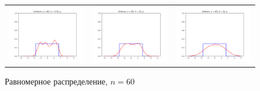 	\begin{figure}[H]
	\centering
	\begin{tabular}{ccc}
		\includegraphics[width=55mm, height =0.25\textheight]{pics/ker_u_60_1.png}
		&
		\includegraphics[width=55mm, height =0.25\textheight]{pics/ker_u_60_2.png}
		&
		\includegraphics[width=55mm, height =0.25\textheight]{pics/ker_u_60_3.png}
	\end{tabular}
	\caption{Равномерное распределение, $n = 60$}
	\label{fig:uniform}
	\end{figure}

